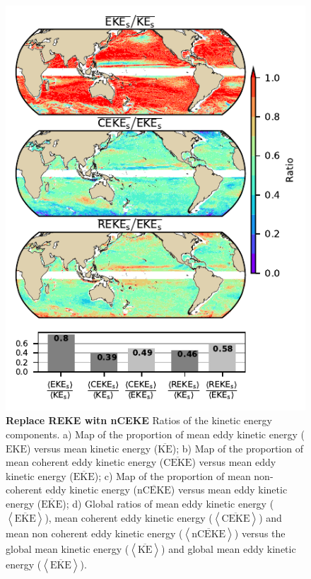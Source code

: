 \documentclass[draft]{agujournal2019}
\newcommand{\MKE}{\overline{\textrm{KE}}}
\newcommand{\MEKE}{\overline{\textrm{EKE}}}
\newcommand{\EKE}{\textrm{EKE}}
\newcommand{\MCEKE}{\overline{\textrm{CEKE}}}
\newcommand{\MnCEKE}{\overline{\textrm{nCEKE}}}
\begin{document}
	\begin{figure}
	    \centering
	    \includegraphics[width=1\textwidth]{figures/eke_ratio_map_all.pdf}
	    \caption{\textbf{Replace REKE witn nCEKE}  Ratios of the kinetic energy components. a) Map of the proportion of mean eddy kinetic energy ($\EKE$) versus mean kinetic energy ($\MKE$);
		b) Map of the proportion of mean coherent eddy kinetic energy ($\MCEKE$) versus mean eddy kinetic energy ($\MEKE$);
		c) Map of the proportion of mean non-coherent eddy kinetic energy ($\MnCEKE$) versus mean eddy kinetic energy ($\MEKE$);
		d) Global ratios of mean eddy kinetic energy ($\left<\MEKE\right>$), mean coherent eddy kinetic energy ($\left<\MCEKE\right>$) and mean non coherent eddy kinetic energy ($\left<\MnCEKE\right>$) versus the global mean kinetic energy ($\left<\MKE\right>$) and global mean eddy kinetic energy ($\left<\MEKE\right>$).
		}
	    \label{fig:my_label}
	\end{figure}
\end{document}
